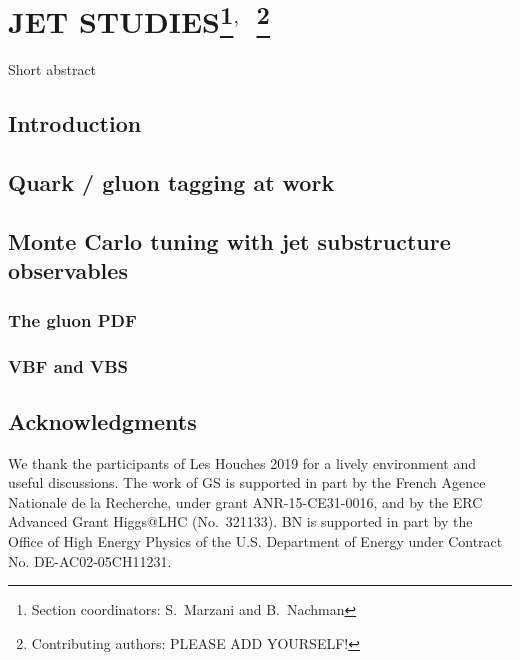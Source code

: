 \documentclass[11pt]{cernrep}
\begin{document}
\section{JET STUDIES\protect\footnote{Section coordinators: S.~Marzani and B.~Nachman}$^{,}$~\protect\footnote{Contributing authors: PLEASE ADD YOURSELF!}}

Short abstract

\subsection{Introduction}

\subsection{Quark / gluon tagging at work}

\subsection{Monte Carlo tuning with jet substructure observables}

\subsubsection{The gluon PDF}

\subsubsection{VBF and VBS}



\subsection*{Acknowledgments}

We thank the participants of Les Houches 2019 for a lively environment and useful discussions.
%
The work of GS is supported in part by the French Agence Nationale de la Recherche,
under grant ANR-15-CE31-0016, and by the ERC Advanced Grant Higgs@LHC
(No.\ 321133).
%
BN is supported in part by the Office of High Energy Physics of the U.S. Department of Energy under Contract No. DE-AC02-05CH11231.
%


\end{document}

